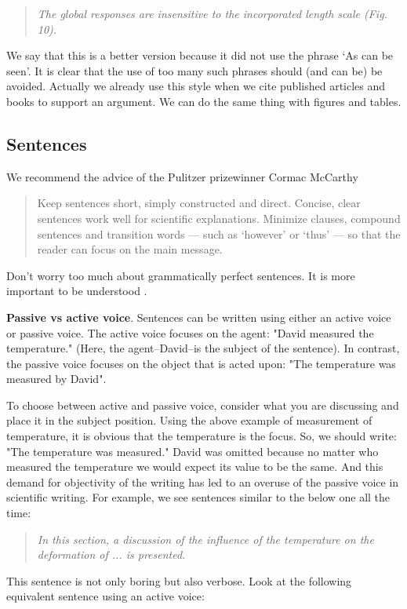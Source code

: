 \documentclass[authoryear,12pta4paper,fleqn]{article}
\numberwithin{equation}{section}
\theoremstyle{remark}
\begin{document}
 \begin{quote}
  \textit{The global responses are insensitive to the incorporated length scale (Fig. 10).}
 \end{quote}
We say that this is a better version because it did not use the phrase `As can be seen'. It is clear that the use of too many such phrases should (and can be) be avoided. 
Actually we already use this style when we cite published articles and books to support an argument. We can do the same thing with figures and tables.

\subsection{Sentences}\label{sec:sentences}

We recommend the advice of the Pulitzer prizewinner Cormac McCarthy \citep{McCarthy}

\begin{quote}
Keep sentences short, simply constructed and direct. Concise, clear sentences work well for scientific explanations. Minimize clauses, compound sentences and transition words — such as ‘however’ or ‘thus’ — so that the reader can focus on the main message.
\end{quote}
Don't worry too much about grammatically perfect sentences. It is more important to be understood \citep{McCarthy}. 


\noindent\textbf{Passive vs active voice}.     Sentences can be written using either an active voice  or passive voice. The active voice focuses on the agent: "David measured the temperature." (Here, the agent--David--is the subject of the sentence). In contrast, the passive voice focuses on the object that is acted upon: "The temperature was measured by David". 

To choose between active and passive voice, consider what you are discussing and place it in the subject position. Using the above example of measurement of temperature, it is obvious that the temperature is the focus. So, we should write: "The temperature was measured." David was omitted because no matter who measured the temperature we would expect its value to be the same. And this demand for objectivity of the writing has led to an overuse of the passive voice in scientific writing. For example, we see  sentences similar to the below one all the time:

\begin{quote}
\textit{In this section, a discussion of the influence of the temperature on the deformation of ... is presented.}
\end{quote}
This sentence is not only boring but also verbose. Look at the following equivalent sentence using an active voice:
\end{document}
